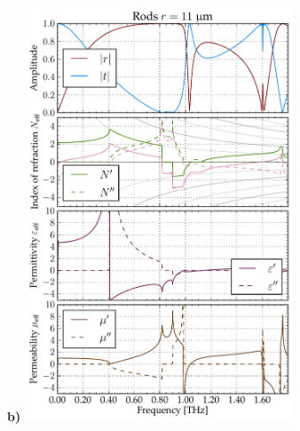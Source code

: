 {\begin{figure}[ht]
\textbf{b)}	\includegraphics[width=8.0cm]{img/old/ERods_eps100_11um_FDTD.pdf}
\end{figure}

}

